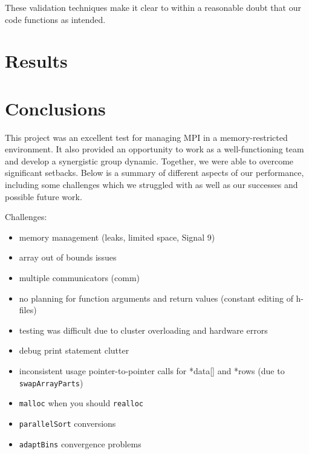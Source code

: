 \documentclass{article}
\begin{document}
These validation techniques make it clear to within a reasonable doubt that our code functions as intended.

%
%

\section{Results}






\section{Conclusions}
This project was an excellent test for managing MPI in a memory-restricted environment.
It also provided an opportunity to work as a well-functioning team and develop a synergistic group dynamic. Together, we were able to overcome significant setbacks. Below is a summary of different aspects of our performance, including some challenges which we struggled with as well as our successes and possible future work.

\medskip

\begin{minipage}{\linewidth}
\begin{mdframed}[backgroundcolor=red!20]
	Challenges:
	\begin{itemize}
		\item memory management (leaks, limited space, Signal 9)
		\item array out of bounds issues
		\item multiple communicators (comm)
		\item no planning for function arguments and return values (constant editing of h-files)
		\item testing was difficult due to cluster overloading and hardware errors
		\item debug print statement clutter
		\item inconsistent usage pointer-to-pointer calls for *data[] and *rows (due to \texttt{swapArrayParts})
		\item \texttt{malloc} when you should \texttt{realloc}
		\item \texttt{parallelSort} conversions
		\item \texttt{adaptBins} convergence problems
	\end{itemize}
\end{mdframed}
\end{minipage}
\end{document}
